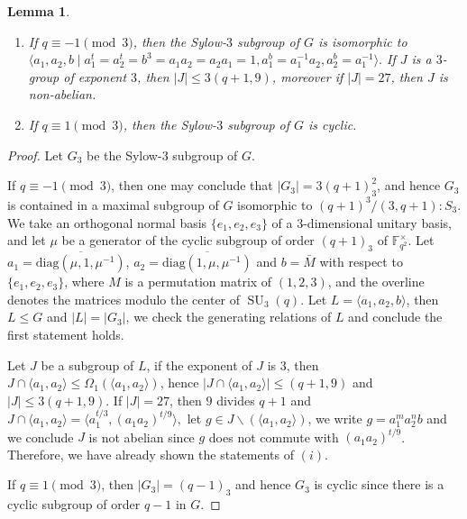 \documentclass[12pt,reqno]{amsart}
\newcommand{\SU}{\operatorname{SU}}
\newcommand{\FF}{\mathbb{F}}
\newcommand{\lr}{\langle}
\newcommand{\rr}{\rangle}
\theoremstyle{plain}
\newtheorem{lemma}[proposition]{Lemma}
\theoremstyle{definition}
\begin{document}
\begin{lemma}\label{Syl-3}
	\begin{enumerate}[\rm(i)]
		\item If $q\equiv -1\pmod 3$, then the Sylow-$3$ subgroup of $G$ is isomorphic to $\lr a_1,a_2,b\mid a_1^t=a_2^t=b^3=a_1a_2=a_2a_1=1,a_1^b=a_1^{-1}a_2,a_2^b=a_1^{-1}  \rr.$
		If $J$ is a $3$-group of exponent $3$, then $|J|\le 3(q+1,9)$, moreover if $|J|=27$, then $J$ is non-abelian.  
		\item 	If $q\equiv 1 \pmod 3$, then the Sylow-$3$ subgroup of $G$ is cyclic.
	\end{enumerate}
	

\end{lemma}
  \begin{proof}
   Let $G_3$ be the Sylow-$3$ subgroup of $G$. 
   
   If $q\equiv -1 \pmod 3$, then one may conclude that $|G_3|=3(q+1)_3^2$, and hence $G_3$ is contained in a maximal subgroup of $G$ isomorphic to $(q+1)^3/(3,q+1){:}S_3.$
   We take an orthogonal normal basis $\{e_1,e_2,e_3\}$ of a $3$-dimensional unitary basis, and let $\mu$ be a generator of the cyclic subgroup of order $(q+1)_3$ of $\FF_{q^2}^{\times}.$ 
   Let $a_1=\overline{\mathrm{diag}(\mu, 1, \mu^{-1})}$, $a_2=\overline{\mathrm{diag}( 1,\mu, \mu^{-1})}$ and $b=\bar{M}$ with respect to $\{e_1,e_2,e_3\}$, where $M$ is a permutation matrix of $(1,2,3)$, and the overline denotes the matrices modulo the center of $\SU_3(q)$. 
   Let $L=\lr a_1,a_2,b\rr$, then $L\le G$ and $|L|=|G_3|$, we check the generating relations of $L$ and conclude the first statement holds.
    
   Let $J$ be a subgroup of $L$, if the exponent of $J$ is $3$, then $J\cap \lr a_1,a_2\rr \le \Omega_1(\lr a_1, a_2 \rr)$, hence $|J\cap \lr a_1,a_2 \rr|\le (q+1,9)$ and $|J|\le 3(q+1,9)$. 
   If $|J|=27$, then $9$ divides $q+1$ and $J\cap \lr a_1,a_2\rr =\lr a_1^{t/3},(a_1a_2)^{t/9}\rr,$ let $g\in J\backslash(\lr a_1, a_2 \rr)$, we write $g=a_1^ma_2^nb$ and we conclude $J$ is not abelian since $g$ does not commute with $(a_1a_2)^{t/9}$.  Therefore, we have already shown the statements of $(i)$.
   
   If $q\equiv 1 \pmod 3$, then $|G_3|=(q-1)_3$ and hence $G_3$ is cyclic since there is a cyclic subgroup of order $q-1$ in $G$.
  \end{proof}
  
\end{document}
